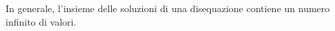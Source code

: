 In generale, l'insieme delle soluzioni di una disequazione %
contiene un numero infinito di valori. 
